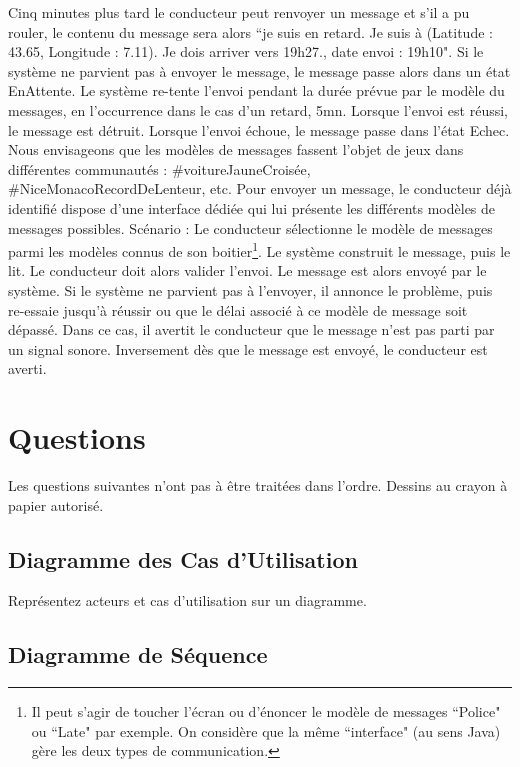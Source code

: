 \documentclass[12pt]{article}
\begin{document}
Cinq minutes plus tard le conducteur peut renvoyer un message et s’il a pu rouler, le  contenu du message sera alors ``je suis en retard. Je suis à (Latitude : 43.65, Longitude :  7.11). Je dois arriver vers 19h27., date envoi : 19h10". 
Si le système ne parvient pas à  envoyer le message, le message passe alors dans un état EnAttente. Le système re-tente  l’envoi pendant la durée prévue par le modèle du messages, en l'occurrence dans le cas  d’un  retard,  5mn.  
Lorsque  l’envoi  est  réussi,  le  message  est  détruit.  
Lorsque  l’envoi  échoue, le message passe dans l’état Echec.  
Nous envisageons que les modèles de messages fassent l’objet de jeux dans différentes  communautés : #voitureJauneCroisée, #NiceMonacoRecordDeLenteur, etc.
Pour envoyer un message, le conducteur déjà identifié dispose d’une interface dédiée  qui lui présente les différents modèles de messages possibles. 
Scénario : Le conducteur sélectionne le modèle de messages parmi les modèles connus  de son boitier\footnote{Il peut s’agir de toucher l’écran ou d’énoncer le modèle de messages ``Police" ou ``Late" par exemple. On considère que la même ``interface" (au sens Java) gère les deux types de communication.}. 
Le système construit le message, puis le lit. Le conducteur doit alors  valider l’envoi. 
Le message est alors envoyé par le système. 
Si le système ne parvient pas  à l’envoyer, il annonce le problème, puis re-essaie jusqu’à réussir ou que le délai associé  à  ce  modèle  de  message  soit  dépassé.  
Dans  ce  cas,  il  avertit  le  conducteur  que  le  message  n’est  pas  parti  par  un  signal  sonore.  
Inversement  dès  que  le  message  est  envoyé, le conducteur est averti.

\section*{Questions}

Les questions suivantes n'ont pas à être traitées dans l'ordre. Dessins au crayon à papier autorisé.

\subsection{Diagramme des Cas d'Utilisation}

Représentez acteurs et cas d’utilisation sur un diagramme. 

\subsection{Diagramme de Séquence}
\end{document}
